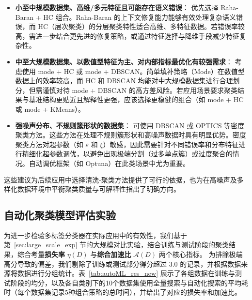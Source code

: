 \documentclass[10pt]{article} %
\numberwithin{equation}{section}
\begin{document}
\begin{itemize}
    \item \textbf{小至中规模数据集、高维/多元特征且可能存在语义错误}：
    优先选择 Raha-Baran + HC 组合。Raha-Baran 的上下文修复能力能够有效处理复杂语义错误，而 HC（层次聚类）的分层聚类特性适合高维、多特征数据。若错误率较高，需进一步结合更先进的修复策略，或通过特征选择与降维手段减少特征复杂性。

    \item \textbf{中至大规模数据集、以数值型特征为主、对内部指标最优化有较强需求}：
    考虑使用 mode + HC 或 mode + DBSCAN。简单填补策略（Mode）在数值型数据上的效率较高，而 HC 和 DBSCAN 均能对中大规模数据集进行合理划分，但需谨慎对待 mode + DBSCAN 的高方差风险。若应用场景要求聚类结果与基准结构更贴近且解释性更强，应该选择更稳健的组合（如 mode + HC 或 mode + KMeans）。

    \item \textbf{强噪声分布、不规则簇形状的数据集}：
    可使用 DBSCAN 或 OPTICS 等密度聚类方法。这些方法在处理不规则簇形状和高噪声数据时具有明显优势。密度聚类方法对超参数（如 $\varepsilon$ 和 $\xi$）敏感，因此需要针对不同错误率和分布特征进行精细化超参数调优，以避免出现极端分割（过多单点簇）或过度聚合的情况。自动调优框架（如 Optuna）在此类场景中尤为重要。
\end{itemize}

这些建议为后续应用中选择清洗-聚类方法提供了可行的依据，也为在高噪声及多样化数据环境中平衡聚类质量与可解释性指出了明确方向。

\subsection{自动化聚类模型评估实验}
\label{sec:automl_exp}

为进一步检验多标签分类器在实际应用中的有效性，我们基于第~\ref{sec:large_scale_exp} 节的大规模对比实验，结合训练与测试阶段的聚类结果，综合考量\textbf{损失率} \(\eta(D)\) 与\textbf{综合加速比} \(\mathcal{A}(D)\) 两个核心指标。
为排除极端高分导致的偏差，我们剔除了训练或测试部分得分超过 3.0 的记录，并根据数据来源将数据进行分组统计。表~\ref{tab:autoML_res_new} 展示了各组数据在训练与测试阶段的均分，以及各自类别下的10个数据集使用全量搜索与自动化搜索的平均耗时（每个数据集记录5种组合策略的总时间），并给出了对应的损失率和加速比。
\end{document}
